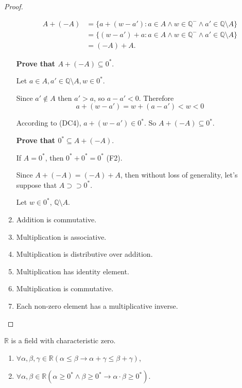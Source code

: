 \begin{proof}
\begin{enumerate}[label = (F\arabic*)]
              \begin{align*}
                  A + (-A) & = \{ a + (w - a') : a\in A\land w\in\mathbb{Q}^{-}\land a'\in\mathbb{Q}\setminus A \} \\
                           & = \{ (w - a') + a : a\in A\land w\in\mathbb{Q}^{-}\land a'\in\mathbb{Q}\setminus A \} \\
                           & = (-A) + A.
              \end{align*}
              \par \textbf{Prove that $A + (-A)\subseteq {0}^{*}$}.
              \par Let $a\in A, a'\in \mathbb{Q}\setminus A, w\in {0}^{*}$.
              \par Since $a'\notin A$ then $a' > a$, so $a - a' < 0$. Therefore
              \[
                  a + (w - a') = w + (a - a') < w < 0
              \]
              \par According to (DC4), $a + (w - a')\in {0}^{*}$. So $A + (-A) \subseteq {0}^{*}$.
              \bigskip
              \par \textbf{Prove that ${0}^{*}\subseteq A + (-A)$}.
              \par If $A = {0}^{*}$, then ${0}^{*} + {0}^{*} = {0}^{*}$ (F2).
              \par Since $A + (-A) = (-A) + A$, then without loss of generality, let's suppose that $A\supset\supset {0}^{*}$.
              \par Let $w\in {0}^{*}$, $\mathbb{Q}\setminus A$.
        \item Addition is commutative.
        \item Multiplication is associative.
        \item Multiplication is distributive over addition.
        \item Multiplication has identity element.
        \item Multiplication is commutative.
        \item Each non-zero element has a multiplicative inverse.
    \end{enumerate}
\end{proof}

\begin{theorem}
    $\mathbb{R}$ is a field with characteristic zero.
\end{theorem}

\begin{theorem}
    \begin{enumerate}[label = (\roman*)]
        \item $\forall\alpha,\beta,\gamma\in\mathbb{R}( \alpha\le\beta \rightarrow \alpha + \gamma \le \beta + \gamma )$,
        \item $\forall\alpha,\beta\in\mathbb{R} (\alpha\ge{0}^{*}\land\beta\ge{0}^{*} \rightarrow\alpha\cdot\beta\ge{0}^{*})$.
    \end{enumerate}
\end{theorem}

